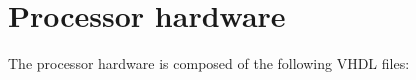 \documentclass[12pt]{article}
\begin{document}
%


\section{Processor hardware}
The processor hardware is composed of the following VHDL files:
\end{document}
